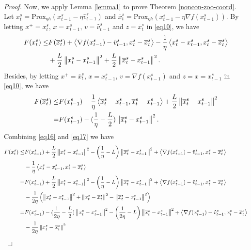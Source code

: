 \documentclass{article}
\newcommand*{\Po}{\text{Prox}}
\newcommand{\norm}[1]{\left\lVert#1\right\rVert}
\newcommand{\Iprod}[2]{\left\langle #1,#2\right\rangle}
\theoremstyle{definition}
\theoremstyle{remark}
\begin{document}
\begin{proof}
Now, we apply Lemma \ref{lemma1} to prove Theorem \ref{noncon-zoo-coord}. Let $x_t^s = \Po_{\eta h} (x_{t-1}^s - \eta \hat{v}_{t-1}^s)$ and $\overline{x}_t^s = \Po_{\eta h} (x_{t-1}^s - \eta \nabla f(x_{t-1}^s))$. By letting $x^+ = x_t^s$, $x = x_{t-1}^s$, $v = \hat{v}_{t-1}^s$ and $z = \overline{x}_t^s$ in \eqref{eq10}, we have
\begin{align}
F(x^s_t) \leq& F(\overline{x}_t^s) + \Iprod{\nabla f(x_{t-1}^s)-\hat{v}_{t-1}^s}{x_t^s-\overline{x}_t^s}-\frac{1}{\eta} \Iprod{x_t^s-x_{t-1}^s}{x_t^s-\overline{x}_t^s}\notag\\
&+\frac{L}{2}\norm{x_t^s-x_{t-1}^s}^2+\frac{L}{2}\norm{\overline{x}_t^s-x_{t-1}^s}^2.\label{eq16}
\end{align}
Besides, by letting $x^+ = \overline{x}_t^s$, $x = x_{t-1}^s$, $v = \nabla f(x_{t-1}^s)$ and $z = x = {x}_{t-1}^s$ in \eqref{eq10}, we have
\begin{align}
F(\overline{x}_t^s) \leq& F({x}_{t-1}^s) - \frac{1}{\eta}\Iprod{\overline{x}_t^s-x_{t-1}^s}{\overline{x}_t^s - x_{t-1}^s}+\frac{L}{2}\norm{\overline{x}_t^s-x_{t-1}^s}^2\notag\\
 =& F({x}_{t-1}^s) -(\frac{1}{\eta}-\frac{L}{2})\norm{\overline{x}_t^s-x_{t-1}^s}^2.\label{eq17} 
\end{align}
Combining \eqref{eq16} and \eqref{eq17} we have 
 \begin{align}
 F({x}_t^s) \leq& F({x}_{t-1}^s) +\frac{L}{2}\norm{{x}_t^s-x_{t-1}^s}^2 - \left(\frac{1}{\eta}-L\right)\norm{\overline{x}_t^s-x_{t-1}^s}^2+\Iprod{\nabla f(x_{t-1}^s)-\hat{v}_{t-1}^s}{x_t^s - \overline{x}_t^s}\notag\\
 & -\frac{1}{\eta} \Iprod{x_t^s-x_{t-1}^s}{x_t^s-\overline{x}_{t}^s}\notag\\
  =& F({x}_{t-1}^s)  +\frac{L}{2}\norm{{x}_t^s-x_{t-1}^s}^2- \left(\frac{1}{\eta}-L\right)\norm{\overline{x}_t^s-x_{t-1}^s}^2+\Iprod{\nabla f(x_{t-1}^s)-\hat{v}_{t-1}^s}{x_t^s - \overline{x}_t^s}\notag\\
 &-\frac{1}{2\eta} \left(\norm{x_t^s-x_{t-1}^s}^2+ \norm{x_t^s-\overline{x}_{t}^s}^2-\norm{\overline{x}_{t}^s-x_{t-1}^s}^2\right)\notag\\
   =& F({x}_{t-1}^s)  -(\frac{1}{2\eta} - \frac{L}{2})\norm{{x}_t^s-x_{t-1}^s}^2- \left(\frac{1}{2\eta}-L\right)\norm{\overline{x}_t^s-x_{t-1}^s}^2+\Iprod{\nabla f(x_{t-1}^s)-\hat{v}_{t-1}^s}{x_t^s - \overline{x}_t^s}\notag\\
 & -\frac{1}{2\eta} \norm{x_t^s-\overline{x}_{t}^s}^2\notag\\

\end{align}
\end{proof}
\end{document}
